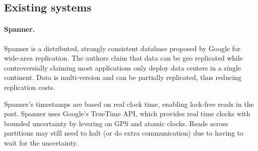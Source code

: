 
\subsection{Existing systems}
\label{subsec:existingSystems}




\paragraph{Spanner.} Spanner \cite{spanner} is a distributed, strongly consistent database proposed by Google for wide-area replication.
The authors claim that data can be geo replicated while controversially claiming most applications only deploy data centers in a single continent.
Data is multi-version and can be partially replicated, thus reducing replication costs.

Spanner's timestamps are based on real clock time, enabling lock-free reads in the past.
Spanner uses Google's TrueTime API, which provides real time clocks with bounded uncertainty by levering on GPS and atomic clocks.
Reads across partitions may still need to halt (or do extra communication) due to having to wait for the uncertainty.

